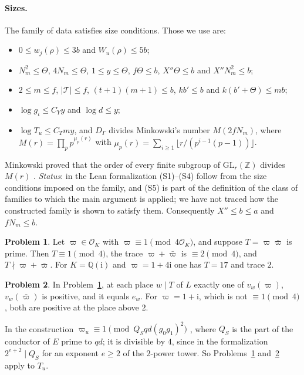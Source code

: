 \documentclass[reqno]{amsart}
\theoremstyle{definition}
\newtheorem{problem}{Problem}[section]
\theoremstyle{plain}
\theoremstyle{remark}
\newcommand{\Z}{\mathbb Z}
\newcommand{\Q}{\mathbb Q}
\newcommand{\Oc}{\mathcal O}
\newcommand{\Tc}{\mathcal T}
\begin{document}
\paragraph{Sizes.}  The family of data satisfies size conditions.  Those we use are:
\begin{itemize}
\item[(S1)] \(0\le w_j(\rho)\le3b\) and \(W_u(\rho)\le5b\);
\item[(S2)] \(N_m^2\le\Theta\), \(4N_m\le\Theta\), \(1\le y\le\Theta\), \(f\Theta\le b\), \(X''\Theta\le b\) and \(X''N_m^2\le b\);
\item[(S3)] \(2\le m\le f\), \(\lvert\Tc\rvert\le f\), \((t+1)(m+1)\le b\), \(kb'\le b\) and \(k(b'+\Theta)\le mb\);
\item[(S4)] \(\log g_\iota\le C_Yy\) and \(\log d\le y\);
\item[(S5)] \(\log T_u\le C_Tmy\), and \(D_\Gamma\) divides Minkowski's number \(M(2fN_m)\), where \(M(r)=\prod_pp^{\mu_p(r)}\) with \(\mu_p(r)=\sum_{i\ge1}\lfloor r/(p^{i-1}(p-1))\rfloor\).
\end{itemize}
Minkowski proved that the order of every finite subgroup of \(\mathrm{GL}_r(\Z)\) divides \(M(r)\) \cite[\S1]{Se}.  \emph{Status}: in the Lean formalization (S1)--(S4) follow from the size conditions imposed on the family, and (S5) is part of the definition of the class of families to which the main argument is applied; we have not traced how the constructed family is shown to satisfy them.  Consequently \(X''\le b\le a\) and \(fN_m\le b\).

\begin{problem}\label{pr:trace}
Let \(\varpi\in\Oc_K\) with \(\varpi\equiv1\pmod{4\Oc_K}\), and suppose \(T=\varpi\bar\varpi\) is prime.  Then \(T\equiv1\pmod 4\), the trace \(\varpi+\bar\varpi\) is \(\equiv2\pmod4\), and \(T\nmid\varpi+\bar\varpi\).  For \(K=\Q(\mathrm i)\) and \(\varpi=1+4\mathrm i\) one has \(T=17\) and trace \(2\).
\end{problem}

\begin{problem}\label{pr:one-of-two}
In Problem~\ref{pr:trace}, at each place \(w\mid T\) of \(L\) exactly one of \(v_w(\varpi)\), \(v_w(\bar\varpi)\) is positive, and it equals \(e_w\).  For \(\varpi=1+\mathrm i\), which is not \(\equiv1\pmod4\), both are positive at the place above \(2\).
\end{problem}

In the construction \(\varpi_u\equiv1\pmod{Q_Sqd(g_0g_1)^2}\) \cite[Rem.~16.8]{Adr}, where \(Q_S\) is the part of the conductor of \(E\) prime to \(qd\); it is divisible by \(4\), since in the formalization \(2^{e+2}\mid Q_S\) for an exponent \(e\ge2\) of the \(2\)-power tower.  So Problems~\ref{pr:trace} and~\ref{pr:one-of-two} apply to \(T_u\).
\end{document}

